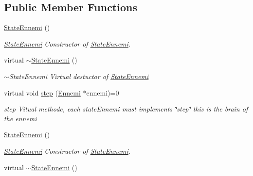 \subsection*{Public Member Functions}
\begin{DoxyCompactItemize}
\item 
\hypertarget{class_state_ennemi_a6ae588f8b9cd09de07eb04b503ff2b49}{}\hyperlink{class_state_ennemi_a6ae588f8b9cd09de07eb04b503ff2b49}{State\+Ennemi} ()\label{class_state_ennemi_a6ae588f8b9cd09de07eb04b503ff2b49}

\begin{DoxyCompactList}\small\item\em \hyperlink{class_state_ennemi}{State\+Ennemi} Constructor of \hyperlink{class_state_ennemi}{State\+Ennemi}. \end{DoxyCompactList}\item 
\hypertarget{class_state_ennemi_a5c94961627d6c485f851c26a204c2a44}{}virtual \hyperlink{class_state_ennemi_a5c94961627d6c485f851c26a204c2a44}{$\sim$\+State\+Ennemi} ()\label{class_state_ennemi_a5c94961627d6c485f851c26a204c2a44}

\begin{DoxyCompactList}\small\item\em $\sim$\+State\+Ennemi Virtual destuctor of \hyperlink{class_state_ennemi}{State\+Ennemi} \end{DoxyCompactList}\item 
virtual void \hyperlink{class_state_ennemi_a8df87629876307ddb6cb241864bb8da8}{step} (\hyperlink{class_ennemi}{Ennemi} $\ast$ennemi)=0
\begin{DoxyCompactList}\small\item\em step Vitual methode, each state\+Ennemi must implements \char`\"{}step\char`\"{} this is the brain of the ennemi \end{DoxyCompactList}\item 
\hypertarget{class_state_ennemi_a6ae588f8b9cd09de07eb04b503ff2b49}{}\hyperlink{class_state_ennemi_a6ae588f8b9cd09de07eb04b503ff2b49}{State\+Ennemi} ()\label{class_state_ennemi_a6ae588f8b9cd09de07eb04b503ff2b49}

\begin{DoxyCompactList}\small\item\em \hyperlink{class_state_ennemi}{State\+Ennemi} Constructor of \hyperlink{class_state_ennemi}{State\+Ennemi}. \end{DoxyCompactList}\item 
\hypertarget{class_state_ennemi_a5c94961627d6c485f851c26a204c2a44}{}virtual \hyperlink{class_state_ennemi_a5c94961627d6c485f851c26a204c2a44}{$\sim$\+State\+Ennemi} ()\label{class_state_ennemi_a5c94961627d6c485f851c26a204c2a44}


\end{DoxyCompactItemize}
